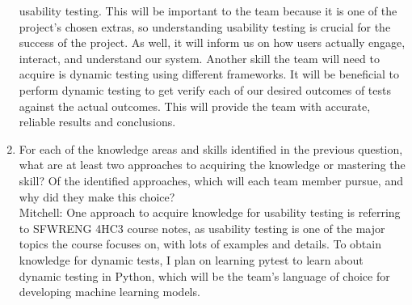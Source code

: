 \documentclass[12pt, titlepage]{article}
\begin{document}
\begin{enumerate}
  usability testing. This will be important to the team because it is one of the project's chosen extras, so understanding
  usability testing is crucial for the success of the project. As well, it will inform us on how users actually engage,
  interact, and understand our system. Another skill the team will need to acquire is dynamic testing using different frameworks.
  It will be beneficial to perform dynamic testing to get verify each of our desired outcomes of tests against the actual outcomes.
  This will provide the team with accurate, reliable results and conclusions.\\
  \item For each of the knowledge areas and skills identified in the previous
  question, what are at least two approaches to acquiring the knowledge or
  mastering the skill?  Of the identified approaches, which will each team
  member pursue, and why did they make this choice?\\
  \newline
  \hspace{2em} Mitchell: One approach to acquire knowledge for usability testing is referring to SFWRENG 4HC3 course notes,
  as usability testing is one of the major topics the course focuses on, with lots of examples and details. To obtain knowledge for dynamic tests, I plan on learning pytest to learn about dynamic testing in Python, which will be the
  team's language of choice for developing machine learning models.\\
\end{enumerate}
\end{document}
